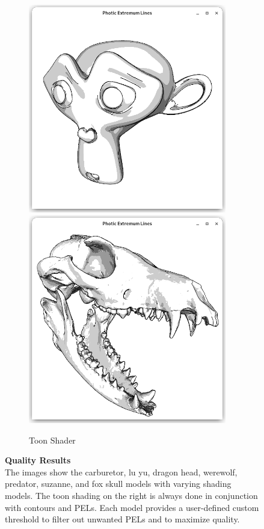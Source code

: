\documentclass[9pt,fleqn,twoside,twocolumn]{stdglobal}
\begin{document}
\begin{figure}
\begin{subfigure}[t]{0.19\textwidth}
        \includegraphics[width=0.95\textwidth,trim={15px 15 15 50},clip]{images/results/suzanne-contours-pel-toon.png}
        \includegraphics[width=0.95\textwidth,trim={15px 15 15 50},clip]{images/results/skull-contours-pel-toon.png}
        \caption{Toon Shader}
      \end{subfigure}%
      \caption{%
        \textbf{Quality Results}\\
        The images show the carburetor, lu yu, dragon head, werewolf, predator, suzanne, and fox skull models with varying shading models.
        The toon shading on the right is always done in conjunction with contours and PELs.
        Each model provides a user-defined custom threshold to filter out unwanted PELs and to maximize quality.
      }
      \label{fig:quality-results}
    \end{figure}
\end{document}
